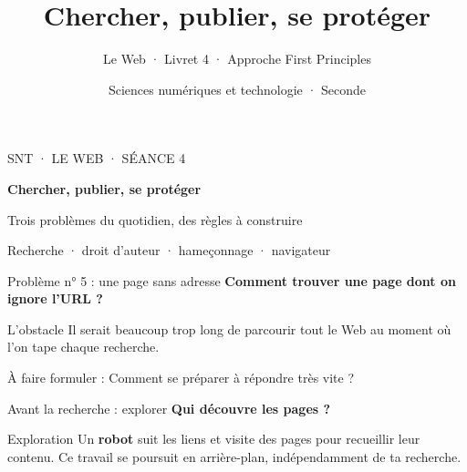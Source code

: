 \documentclass[aspectratio=169,11pt]{beamer}
\title{Chercher, publier, se protéger}
\subtitle{Le Web · Livret 4 · Approche First Principles}
\author{Sciences numériques et technologie · Seconde}
\date{}
\newcommand{\question}[1]{{\Large\color{or}\bfseries #1}}
\newcommand{\reperes}[1]{\vfill{\color{rose}\footnotesize À faire formuler : }{\footnotesize #1}}
\begin{document}
\begin{frame}[plain]
\vspace{1.1cm}
{\color{or}\large SNT · LE WEB · SÉANCE 4}\par\vspace{7mm}
{\Huge\bfseries Chercher, publier, se protéger}\par\vspace{7mm}
{\color{rose}\Large Trois problèmes du quotidien, des règles à construire}\par
\vfill \small Recherche · droit d'auteur · hameçonnage · navigateur
\end{frame}

\begin{frame}{Problème n° 5 : une page sans adresse}
\question{Comment trouver une page dont on ignore l'URL ?}
\vspace{6mm}
\begin{center}
\end{center}
\vspace{6mm}
\pause
\begin{block}{L'obstacle}
Il serait beaucoup trop long de parcourir tout le Web au moment où l'on tape chaque recherche.
\end{block}
\reperes{Comment se préparer à répondre très vite ?}
\end{frame}

\begin{frame}{Avant la recherche : explorer}
\question{Qui découvre les pages ?}
\vspace{5mm}
\begin{center}
\end{center}
\pause
\begin{block}{Exploration}
Un \textbf{robot} suit les liens et visite des pages pour recueillir leur contenu. Ce travail se poursuit en arrière-plan, indépendamment de ta recherche.
\end{block}
\end{frame}
\end{document}
